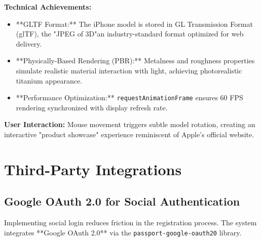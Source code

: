 \documentclass[12pt, a4paper]{report}
\begin{document}
\textbf{Technical Achievements:}
\begin{itemize}
    \item **GLTF Format:** The iPhone model is stored in GL Transmission Format (glTF), the "JPEG of 3D"an industry-standard format optimized for web delivery.
    \item **Physically-Based Rendering (PBR):** Metalness and roughness properties simulate realistic material interaction with light, achieving photorealistic titanium appearance.
    \item **Performance Optimization:** \texttt{requestAnimationFrame} ensures 60 FPS rendering synchronized with display refresh rate.
\end{itemize}

\textbf{User Interaction:} Mouse movement triggers subtle model rotation, creating an interactive "product showcase" experience reminiscent of Apple's official website.

\section{Third-Party Integrations}

\subsection{Google OAuth 2.0 for Social Authentication}

Implementing social login reduces friction in the registration process. The system integrates **Google OAuth 2.0** via the \texttt{passport-google-oauth20} library.
\end{document}
